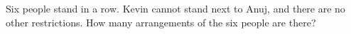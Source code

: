 Six people stand in a row. Kevin cannot stand next to Anuj, and there are no other restrictions. How many arrangements of the six people are there?
